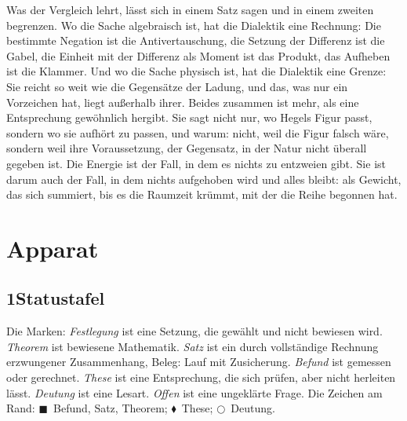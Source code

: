 \documentclass[11pt,a4paper]{article}
\newcommand{\EB}{\textcolor{befund}{$\blacksquare$}}
\newcommand{\EE}{\textcolor{entspr}{$\blacklozenge$}}
\newcommand{\EL}{\textcolor{lesart}{$\bigcirc$}}
\begin{document}
Was der Vergleich lehrt, lässt sich in einem Satz sagen und in einem zweiten begrenzen. Wo die Sache algebraisch ist, hat die Dialektik eine Rechnung: Die bestimmte Negation ist die Antivertauschung, die Setzung der Differenz ist die Gabel, die Einheit mit der Differenz als Moment ist das Produkt, das Aufheben ist die Klammer. Und wo die Sache physisch ist, hat die Dialektik eine Grenze: Sie reicht so weit wie die Gegensätze der Ladung, und das, was nur ein Vorzeichen hat, liegt außerhalb ihrer. Beides zusammen ist mehr, als eine Entsprechung gewöhnlich hergibt. Sie sagt nicht nur, wo Hegels Figur passt, sondern wo sie aufhört zu passen, und warum: nicht, weil die Figur falsch wäre, sondern weil ihre Voraussetzung, der Gegensatz, in der Natur nicht überall gegeben ist. Die Energie ist der Fall, in dem es nichts zu entzweien gibt. Sie ist darum auch der Fall, in dem nichts aufgehoben wird und alles bleibt: als Gewicht, das sich summiert, bis es die Raumzeit krümmt, mit der die Reihe begonnen hat.

\newpage
\section*{Apparat}

\subsection*{1\quad Statustafel}

Die Marken: \emph{Festlegung} ist eine Setzung, die gewählt und nicht bewiesen wird. \emph{Theorem} ist bewiesene Mathematik. \emph{Satz} ist ein durch vollständige Rechnung erzwungener Zusammenhang, Beleg: Lauf mit Zusicherung. \emph{Befund} ist gemessen oder gerechnet. \emph{These} ist eine Entsprechung, die sich prüfen, aber nicht herleiten lässt. \emph{Deutung} ist eine Lesart. \emph{Offen} ist eine ungeklärte Frage. Die Zeichen am Rand: \EB\ Befund, Satz, Theorem; \EE\ These; \EL\ Deutung.
\end{document}
